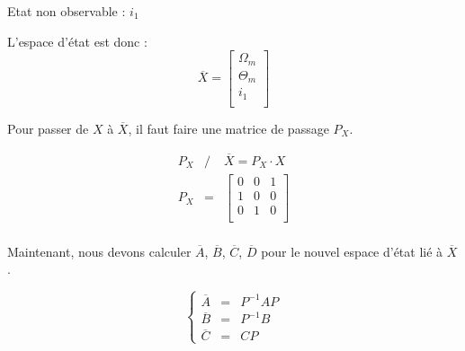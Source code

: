 \noindent\textbullet\hspace{2mm} Etat non observable : $i_1$

\noindent\textbullet\hspace{2mm} L'espace d'état est donc : 
\begin{equation}
\overline{X} = \begin{bmatrix}
\Omega_m\\
\Theta_m\\
i_1\\
\end{bmatrix}
\end{equation}

Pour passer de $X$ à $\overline{X}$, il faut faire une matrice de passage $P_X$.

 \begin{eqnarray}
 P_X &/&  \overline{X} =P_X \cdot X \\
 P_X &=&\begin{bmatrix}
 0 & 0 & 1 \\
 1 & 0 & 0 \\
 0 & 1 & 0 \\
\end{bmatrix}  \\
 \end{eqnarray}

Maintenant, nous devons calculer $\overline{A}$, $\overline{B}$, $\overline{C}$, $\overline{D}$ pour le nouvel espace d'état lié à $\overline{X}$.

\begin{equation}%
	\left\lbrace%
	\begin{matrix}
		\overline{A} &=& P^{-1} A P \\%
		\overline{B} &=& P^{-1} B \\%
		\overline{C} &=& C P%
	\end{matrix}
\right.%
\end{equation}
